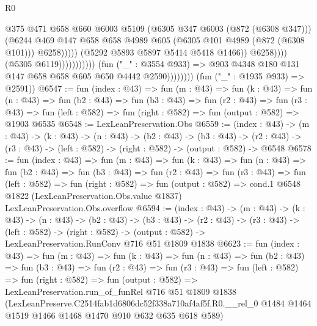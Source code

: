\begin{lexlean}{R0}
\begin{coremodule}
                                                          @375
                                                          @471
                                                          @658
                                                          @660
                                                          @6003
                                                          @5109
                                                          (@6305 @347 @6003 (@872 (@6308 @347)))
                                                          (@6244
                                                            @469
                                                            @147
                                                            @658
                                                            @658
                                                            @4989
                                                            @605
                                                            (@6305 @101 @4989 (@872 (@6308 @101)))
                                                            @6258)))))
                                                  (@5292 @5893 @5897 @5414 @5418 @1466))
                                                @6258))))
                                        (@5305 @6119)))))))))))
                    (fun ("_" : @3554 @933) =>
                    @903 @4348 @180 @131 @147 @658 @658 @605 @650 @4442 @2590))))))))
      (fun ("_" : @1935 @933) => @2591))
@6547 := fun (index : @43) =>
  fun (m : @43) =>
  fun (k : @43) =>
  fun (n : @43) =>
  fun (b2 : @43) =>
  fun (b3 : @43) =>
  fun (r2 : @43) =>
  fun (r3 : @43) => fun (left : @582) => fun (right : @582) => fun (output : @582) => @1903 @6535
@6548 := LexLeanPreservation.Obs
@6559 := (index : @43) ->
  (m : @43) ->
  (k : @43) ->
  (n : @43) ->
  (b2 : @43) ->
  (b3 : @43) ->
  (r2 : @43) -> (r3 : @43) -> (left : @582) -> (right : @582) -> (output : @582) -> @6548
@6578 := fun (index : @43) =>
  fun (m : @43) =>
  fun (k : @43) =>
  fun (n : @43) =>
  fun (b2 : @43) =>
  fun (b3 : @43) =>
  fun (r2 : @43) =>
  fun (r3 : @43) =>
  fun (left : @582) =>
  fun (right : @582) =>
  fun (output : @582) =>
  cond.{1} @6548 @1822 (LexLeanPreservation.Obs.value @1837) LexLeanPreservation.Obs.overflow
@6594 := (index : @43) ->
  (m : @43) ->
  (k : @43) ->
  (n : @43) ->
  (b2 : @43) ->
  (b3 : @43) ->
  (r2 : @43) ->
  (r3 : @43) ->
  (left : @582) ->
  (right : @582) -> (output : @582) -> LexLeanPreservation.RunConv @716 @51 @1809 @1838
@6623 := fun (index : @43) =>
  fun (m : @43) =>
  fun (k : @43) =>
  fun (n : @43) =>
  fun (b2 : @43) =>
  fun (b3 : @43) =>
  fun (r2 : @43) =>
  fun (r3 : @43) =>
  fun (left : @582) =>
  fun (right : @582) =>
  fun (output : @582) =>
  LexLeanPreservation.run_of_funRel
    @716
    @51
    @1809
    @1838
    (LexLeanPreserve.C2514fab1d6806dc52f338a710af4af5f.R0.__rel_0
      @1484
      @1464
      @1519
      @1466
      @1468
      @1470
      @910
      @632
      @635
      @618
      @589)
\end{coremodule}
\end{lexlean}
